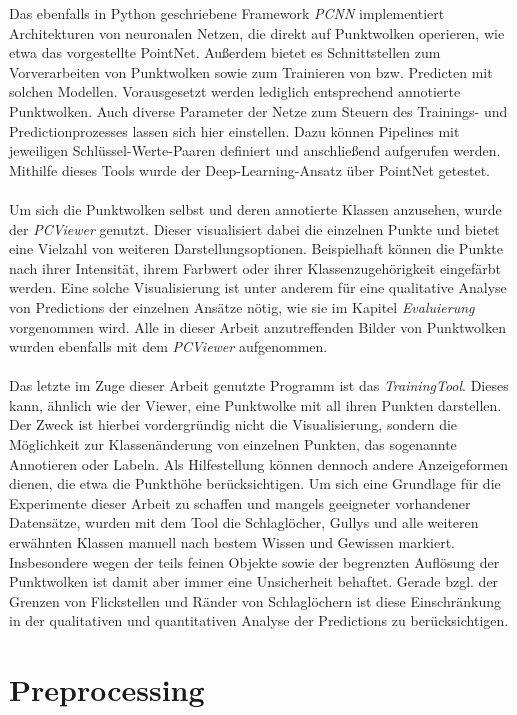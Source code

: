 Das ebenfalls in Python geschriebene Framework \textit{PCNN} implementiert Architekturen von neuronalen Netzen, die direkt auf Punktwolken operieren, wie etwa das vorgestellte PointNet. Außerdem bietet es Schnittstellen zum Vorverarbeiten von Punktwolken sowie zum Trainieren von bzw. Predicten mit solchen Modellen. Vorausgesetzt werden lediglich entsprechend annotierte Punktwolken. Auch diverse Parameter der Netze zum Steuern des Trainings- und Predictionprozesses lassen sich hier einstellen. Dazu können Pipelines mit jeweiligen Schlüssel-Werte-Paaren definiert und anschließend aufgerufen werden. Mithilfe dieses Tools wurde der Deep-Learning-Ansatz über PointNet getestet. \\\\
Um sich die Punktwolken selbst und deren annotierte Klassen anzusehen, wurde der \textit{PCViewer} genutzt. Dieser visualisiert dabei die einzelnen Punkte und bietet eine Vielzahl von weiteren Darstellungsoptionen. Beispielhaft können die Punkte nach ihrer Intensität, ihrem Farbwert oder ihrer Klassenzugehörigkeit eingefärbt werden. Eine solche Visualisierung ist unter anderem für eine qualitative Analyse von Predictions der einzelnen Ansätze nötig, wie sie im Kapitel \textit{Evaluierung} vorgenommen wird. Alle in dieser Arbeit anzutreffenden Bilder von Punktwolken wurden ebenfalls mit dem \textit{PCViewer} aufgenommen. \\\\
Das letzte im Zuge dieser Arbeit genutzte Programm ist das \textit{TrainingTool}. Dieses kann, ähnlich wie der Viewer, eine Punktwolke mit all ihren Punkten darstellen. Der Zweck ist hierbei vordergründig nicht die Visualisierung, sondern die Möglichkeit zur Klassenänderung von einzelnen Punkten, das sogenannte Annotieren oder Labeln. Als Hilfestellung können dennoch andere Anzeigeformen dienen, die etwa die Punkthöhe berücksichtigen. Um sich eine Grundlage für die Experimente dieser Arbeit zu schaffen und mangels geeigneter vorhandener Datensätze, wurden mit dem Tool die Schlaglöcher, Gullys und alle weiteren erwähnten Klassen manuell nach bestem Wissen und Gewissen markiert. Insbesondere wegen der teils feinen Objekte sowie der begrenzten Auflösung der Punktwolken ist damit aber immer eine Unsicherheit behaftet. Gerade bzgl. der Grenzen von Flickstellen und Ränder von Schlaglöchern ist diese Einschränkung in der qualitativen und quantitativen Analyse der Predictions zu berücksichtigen.

\section{Preprocessing} 


